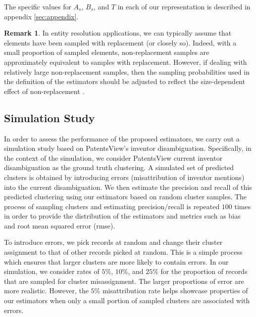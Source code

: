 \documentclass[fontsize=11pt]{article}
\theoremstyle{definition}
\newtheorem{remark}{Remark}
\begin{document}
The specific values for $A_s$, $B_s$, and $T$ in each of our representation is described in appendix \ref{sec:appendix}.


\begin{remark}
    In entity resolution applications, we can typically assume that elements have been sampled with replacement (or closely so). Indeed, with a small proportion of sampled elements, non-replacement samples are approximately equivalent to samples with replacement. However, if dealing with relatively large non-replacement samples, then the sampling probabilities used in the definition of the estimators should be adjusted to reflect the size-dependent effect of non-replacement \citep{Horvitz1952}.
\end{remark}

\subsection{Simulation Study}\label{sec:simulation_study}

In order to assess the performance of the proposed estimators, we carry out a simulation study based on PatentsView's inventor disambiguation. Specifically, in the context of the simulation, we consider PatentsView current inventor disambiguation as the ground truth clustering. A simulated set of predicted clusters is obtained by introducing errors (misattribution of inventor mentions) into the current disambiguation. We then estimate the precision and recall of this predicted clustering using our estimators based on random cluster samples. The process of sampling clusters and estimating precision/recall is repeated $100$ times in order to provide the distribution of the estimators and metrics such as bias and root mean squared error (rmse). 

To introduce errors, we pick records at random and change their cluster assignment to that of other records picked at random. This is a simple process which ensures that larger clusters are more likely to contain errors. In our simulation, we consider rates of $5\%$, $10\%$, and $25\%$ for the proportion of records that are sampled for cluster misassignment. The larger proportions of error are more realistic. However, the $5\%$ misattribution rate helps showcase properties of our estimators when only a small portion of sampled clusters are associated with errors.
\end{document}
